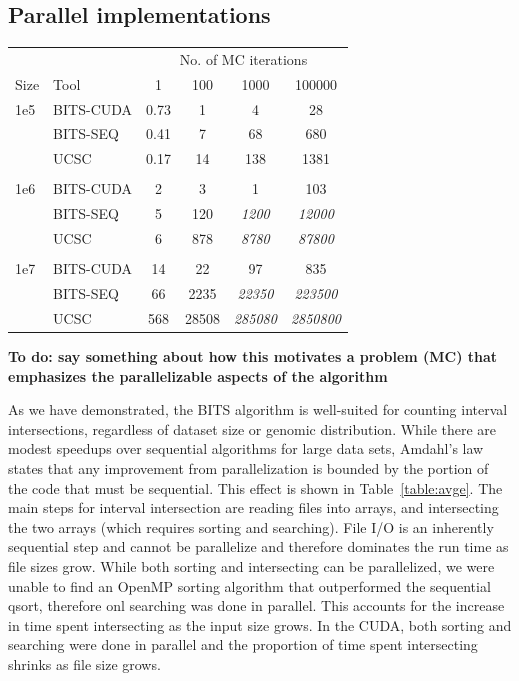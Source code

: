 \documentclass{bioinfo}
\begin{document}
\subsection{Parallel implementations}

\centering
\begin{center}
	\begin{tabular}{l l c c c c}
	\multicolumn{2}{c}{} & \multicolumn{4}{c}{No. of MC iterations} \\
	\cline{3-6}
	Size & Tool & 1 & 100 & 1000 & 100000 \\
	\hline
	\hline
	1e5 & BITS-CUDA & 0.73 & 1  & 4   & 28 \\
		& BITS-SEQ  & 0.41 & 7  & 68  & 680 \\
		& UCSC      & 0.17 & 14 & 138 & 1381 \\
	\\
	1e6 & BITS-CUDA & 2 & 3    & 1       & 103 \\
		& BITS-SEQ  & 5 & 120  & \emph{1200} & \emph{12000} \\
		& UCSC      & 6 & 878  & \emph{8780} & \emph{87800} \\
	\\
	1e7 & BITS-CUDA & 14  & 22    & 97            & 835 \\
		& BITS-SEQ  & 66  & 2235  & \emph{22350}  & \emph{223500} \\
		& UCSC      & 568 & 28508 & \emph{285080} & \emph{2850800} \\
	
	\hline
	\end{tabular}
\end{center}
\label{table:avge}

		
\textbf{To do: say something about how this motivates a problem (MC)
that emphasizes the parallelizable aspects of the algorithm}

As we have demonstrated, the BITS algorithm is well-suited for counting interval
intersections, regardless of dataset size or genomic distribution.  While there
are modest speedups over sequential algorithms for large data sets, Amdahl's
law~\citep{amdahl1967} states that any improvement from parallelization is
bounded by  the portion of the code that must be sequential.  This effect is
shown in Table~\ref{table:avge}.  The main steps for interval intersection are
reading files into arrays, and intersecting the two arrays (which requires
sorting and searching).  File I/O is an inherently sequential step and cannot be
parallelize and therefore dominates the run time as file sizes grow.  While both
sorting and intersecting can be parallelized, we were unable to find an OpenMP
sorting algorithm that outperformed the sequential qsort, therefore onl
searching was done in parallel.  This accounts for the increase in time spent
intersecting as the input size grows.  In the CUDA, both sorting and searching
were done in parallel and the proportion of time spent intersecting shrinks as
file size grows.
\end{document}
